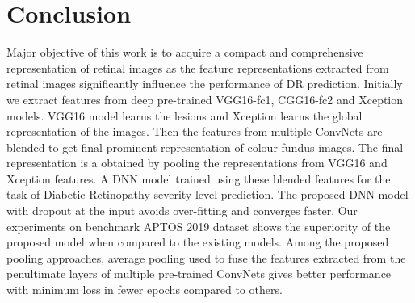 \documentclass[electronics,article,accept ,moreauthors,pdftex]{mdpi}
\begin{document}
\section{Conclusion}
Major objective of this work is to acquire a compact and comprehensive representation of retinal images as the feature representations extracted from retinal images significantly  influence the performance of DR prediction.    
Initially we extract features from deep pre-trained VGG16-fc1, CGG16-fc2 and Xception models. VGG16 model learns the lesions and Xception learns the global representation of the images. Then the features from multiple ConvNets are blended to get final prominent representation of colour fundus images. The final representation is a obtained by pooling the representations from VGG16 and Xception features. A DNN model trained using these blended features for the task of Diabetic Retinopathy severity level prediction. The proposed DNN model with dropout at the input avoids over-fitting and converges faster. Our  experiments on benchmark APTOS 2019 dataset shows the superiority of the proposed model when compared to the existing models. 
Among the proposed pooling approaches, average pooling used to fuse the features extracted from the penultimate layers of multiple pre-trained ConvNets gives better performance with minimum loss in fewer epochs compared to others. 

\vspace{6pt}





\vspace{6pt} 
\end{document}
